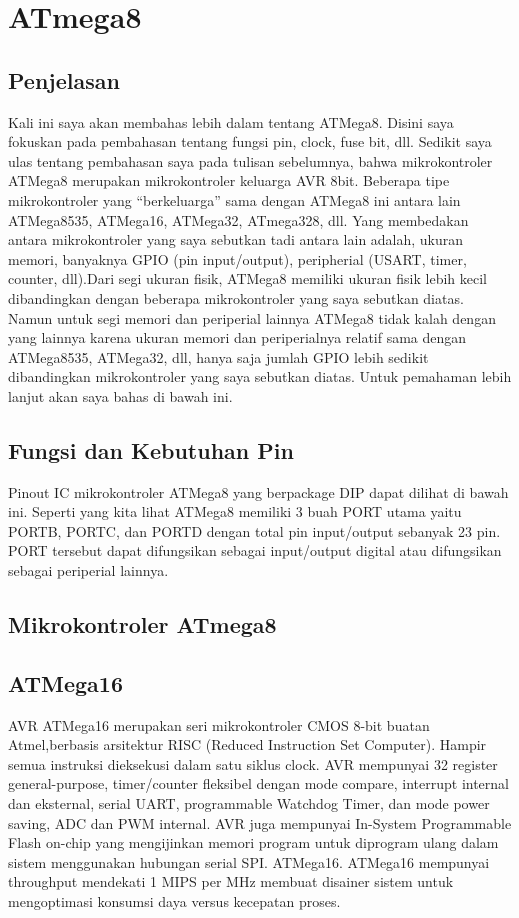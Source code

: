 \section{ATmega8}

	\subsection{Penjelasan}
		Kali ini saya akan membahas lebih dalam tentang ATMega8. Disini saya fokuskan pada pembahasan tentang fungsi pin, clock, fuse bit, dll.
		Sedikit saya ulas tentang pembahasan saya pada tulisan sebelumnya, bahwa mikrokontroler ATMega8 merupakan mikrokontroler keluarga AVR 8bit. Beberapa tipe mikrokontroler yang “berkeluarga” sama dengan ATMega8 ini antara lain ATMega8535, ATMega16, ATMega32, ATmega328, dll. Yang membedakan antara mikrokontroler yang saya sebutkan tadi antara lain adalah, ukuran memori, banyaknya GPIO (pin input/output), peripherial (USART, timer, counter, dll).Dari segi ukuran fisik, ATMega8 memiliki ukuran fisik lebih kecil dibandingkan dengan beberapa mikrokontroler yang saya sebutkan diatas. Namun untuk segi memori dan periperial lainnya ATMega8 tidak kalah dengan yang lainnya karena ukuran memori dan periperialnya relatif sama dengan ATMega8535, ATMega32, dll, hanya saja jumlah GPIO lebih sedikit dibandingkan mikrokontroler yang saya sebutkan diatas. Untuk pemahaman lebih lanjut akan saya bahas di bawah ini.
	
	\subsection{Fungsi dan Kebutuhan Pin}
		Pinout IC mikrokontroler ATMega8 yang berpackage DIP dapat dilihat di bawah ini.
		Seperti yang kita lihat ATMega8 memiliki 3 buah PORT utama yaitu PORTB, PORTC, dan PORTD dengan total pin input/output sebanyak 23 pin. PORT tersebut dapat difungsikan sebagai input/output digital atau difungsikan sebagai periperial lainnya.
		
	\subsection{Mikrokontroler ATmega8}
		
	\subsection{ATMega16}
		AVR ATMega16 merupakan seri mikrokontroler CMOS 8-bit buatan Atmel,berbasis arsitektur RISC (Reduced Instruction Set Computer). Hampir semua instruksi dieksekusi dalam satu siklus clock. AVR mempunyai 32 register general-purpose, timer/counter fleksibel dengan mode compare, interrupt internal dan eksternal, serial UART, programmable Watchdog Timer, dan mode power saving, ADC dan PWM internal. AVR juga mempunyai In-System Programmable Flash on-chip yang mengijinkan memori program untuk diprogram ulang dalam sistem menggunakan hubungan serial SPI. ATMega16. ATMega16 mempunyai throughput mendekati 1 MIPS per MHz membuat disainer sistem untuk mengoptimasi konsumsi daya versus kecepatan proses.
